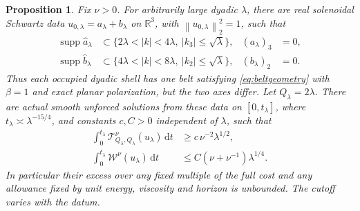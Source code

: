 \documentclass[11pt]{article}
\newtheorem{proposition}{Proposition}
\newcommand{\R}{\mathbb R}
\newcommand{\dd}{\,\mathrm d}
\newcommand{\norm}[1]{\left\lVert#1\right\rVert}
\begin{document}
\begin{proposition}\label{prop:crossedbelts}
Fix $\nu>0$. For arbitrarily large dyadic $\lambda$, there are real
solenoidal Schwartz data $u_{0,\lambda}=a_\lambda+b_\lambda$ on $\R^3$,
with $\norm{u_{0,\lambda}}_2^2=1$, such that
\begin{align}
 \operatorname{supp}\widehat a_\lambda
 &\subset\{2\lambda<|k|<4\lambda,\ |k_3|\leq\sqrt\lambda\},
 & (a_\lambda)_3&=0,\label{eq:crossedgeometry}\\
 \operatorname{supp}\widehat b_\lambda
 &\subset\{4\lambda<|k|<8\lambda,\ |k_2|\leq\sqrt\lambda\},
 & (b_\lambda)_2&=0.\nonumber
\end{align}
Thus each occupied dyadic shell has one belt satisfying
\eqref{eq:beltgeometry} with $\beta=1$ and exact planar polarization,
but the two axes differ. Let $Q_\lambda=2\lambda$. There are actual
smooth unforced solutions from these data on $[0,t_\lambda]$, where
$t_\lambda\asymp\lambda^{-15/4}$, and constants $c,C>0$ independent
of $\lambda$, such that
\begin{align}
 \int_0^{t_\lambda}\mathcal T_{Q_\lambda,Q_\lambda}^\nu(u_\lambda)
       \dd t&\geq c\,\nu^{-2}\lambda^{1/2},\label{eq:crossedreturn}\\
 \int_0^{t_\lambda}\mathcal W^\nu(u_\lambda)\dd t
       &\leq C(\nu+\nu^{-1})\lambda^{1/4}.\label{eq:crossedcost}
\end{align}
In particular their excess over any fixed multiple of the full cost
and any allowance fixed by unit energy, viscosity and horizon is
unbounded. The cutoff varies with the datum.
\end{proposition}
\end{document}
